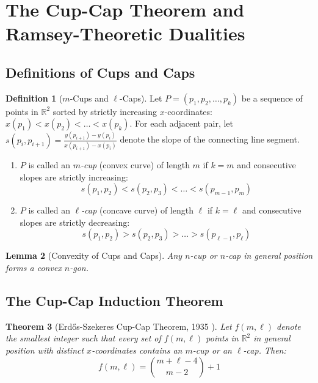 \documentclass[11pt,a4paper]{article}
\newtheorem{theorem}{Theorem}[section]
\newtheorem{lemma}[theorem]{Lemma}
\theoremstyle{definition}
\newtheorem{definition}[theorem]{Definition}
\begin{document}
\section{The Cup-Cap Theorem and Ramsey-Theoretic Dualities}

\subsection{Definitions of Cups and Caps}

\begin{definition}[$m$-Cups and $\ell$-Caps]\label{def:cup_cap}
Let $P = (p_1, p_2, \dots, p_k)$ be a sequence of points in $\mathbb{R}^2$ sorted by strictly increasing $x$-coordinates: $x(p_1) < x(p_2) < \dots < x(p_k)$.
For each adjacent pair, let $s(p_i, p_{i+1}) = \frac{y(p_{i+1}) - y(p_i)}{x(p_{i+1}) - x(p_i)}$ denote the slope of the connecting line segment.
\begin{enumerate}
    \item $P$ is called an \emph{$m$-cup} (convex curve) of length $m$ if $k = m$ and consecutive slopes are strictly increasing:
    \[ s(p_1, p_2) < s(p_2, p_3) < \dots < s(p_{m-1}, p_m) \]
    \item $P$ is called an \emph{$\ell$-cap} (concave curve) of length $\ell$ if $k = \ell$ and consecutive slopes are strictly decreasing:
    \[ s(p_1, p_2) > s(p_2, p_3) > \dots > s(p_{\ell-1}, p_\ell) \]
\end{enumerate}
\end{definition}

\begin{lemma}[Convexity of Cups and Caps]\label{lem:cup_cap_convex}
Any $n$-cup or $n$-cap in general position forms a convex $n$-gon.
\end{lemma}

\subsection{The Cup-Cap Induction Theorem}

\begin{theorem}[Erd\H{o}s-Szekeres Cup-Cap Theorem, 1935 \cite{erdos1935}]\label{thm:cup_cap}
Let $f(m, \ell)$ denote the smallest integer such that every set of $f(m, \ell)$ points in $\mathbb{R}^2$ in general position with distinct $x$-coordinates contains an $m$-cup or an $\ell$-cap. Then:
\begin{equation}\label{eq:cup_cap_formula}
f(m, \ell) = \binom{m + \ell - 4}{m - 2} + 1
\end{equation}
\end{theorem}
\end{document}
